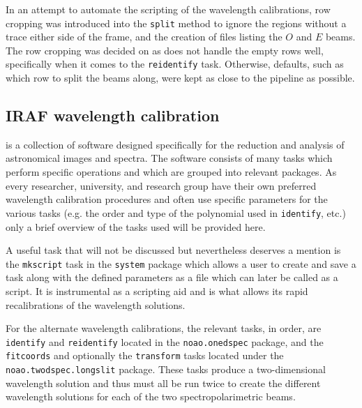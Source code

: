 In an attempt to automate the scripting of the \iraf wavelength calibrations, row cropping was introduced into the \texttt{split} method to ignore the regions without a trace either side of the frame, and the creation of files listing the $O$ and $E$ beams. The row cropping was decided on as \iraf does not handle the empty rows well, specifically when it comes to the \texttt{reidentify} task. Otherwise, defaults, such as which row to split the beams along, were kept as close to the \polsalt pipeline as possible.


\subsection{IRAF wavelength calibration}\label{subsec:IRAF_wav_cal}

\iraf is a collection of software designed specifically for the reduction and analysis of astronomical images and spectra. The software consists of many tasks which perform specific operations and which are grouped into relevant packages. As every researcher, university, and research group have their own preferred wavelength calibration procedures and often use specific parameters for the various \iraf tasks (e.g. the order and type of the polynomial used in \texttt{identify}, etc.) only a brief overview of the tasks used will be provided here.
\prgph

A useful \iraf task that will not be discussed but nevertheless deserves a mention is the \texttt{mkscript} task in the \texttt{system} package which allows a user to create and save a task along with the defined parameters as a file which can later be called as a script. It is instrumental as a scripting aid and is what allows \iraf its rapid recalibrations of the wavelength solutions.
\prgph

For the alternate wavelength calibrations, the relevant tasks, in order, are \texttt{identify} and \texttt{reidentify} located in the \texttt{noao.onedspec} package, and the \texttt{fitcoords} and optionally the \texttt{transform} tasks located under the \texttt{noao.twodspec.longslit} package. These tasks produce a two-dimensional wavelength solution and thus must all be run twice to create the different wavelength solutions for each of the two spectropolarimetric beams.


